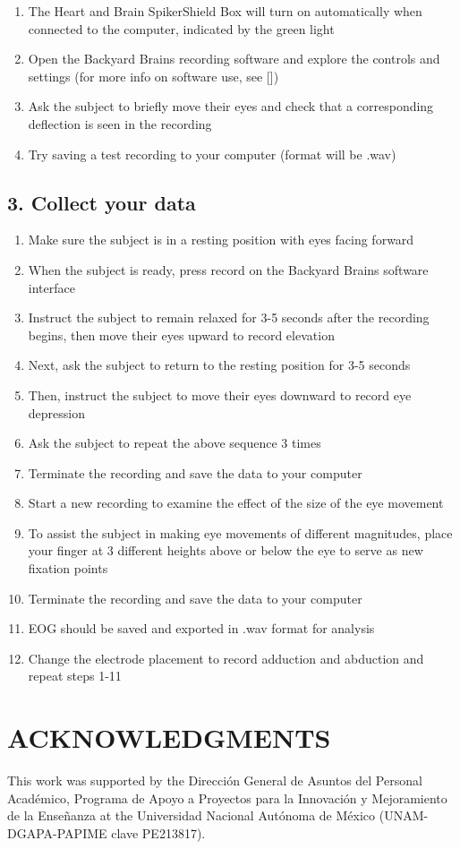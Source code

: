 \documentclass[12pt]{article}
\begin{document}
\begin{enumerate}
\item The Heart and Brain SpikerShield Box will turn on automatically when 
connected to the computer, indicated by the green light 
\item Open the Backyard Brains recording software and explore the controls and settings (for more info on software use, see [\cite{spikeRecorder}]) 
\item Ask the subject to briefly move their eyes and check that a corresponding deflection is seen in the recording
\item Try saving a test recording to your computer (format will be .wav)
\end{enumerate}

\subsection*{3. Collect your data}

\begin{enumerate}
\item Make sure the subject is in a resting position with eyes facing forward
\item When the subject is ready, press record on the Backyard Brains software interface
\item Instruct the subject to remain relaxed for 3-5 seconds after the recording begins, then move their eyes upward to record elevation
\item Next, ask the subject to return to the resting position for 3-5 seconds 
\item Then, instruct the subject to move their eyes downward to record eye depression
\item Ask the subject to repeat the above sequence 3 times 
\item Terminate the recording and save the data to your computer
\item Start a new recording to examine the effect of the size of the eye movement
\item To assist the subject in making eye movements of different magnitudes, place your finger at 3 different heights above or below the eye to serve as new fixation points
\item Terminate the recording and save the data to your computer 
\item EOG should be saved and exported in .wav format for analysis
\item Change the electrode placement to record adduction and abduction and repeat steps 1-11
\end{enumerate}

\section*{ACKNOWLEDGMENTS}
This work was supported by the Dirección General de Asuntos del Personal Académico, Programa de Apoyo a Proyectos para la Innovación y Mejoramiento de la Enseñanza at the Universidad Nacional Autónoma de México (UNAM-DGAPA-PAPIME clave PE213817).

\newpage
 
\begin{small}

\end{small}
\end{document}
